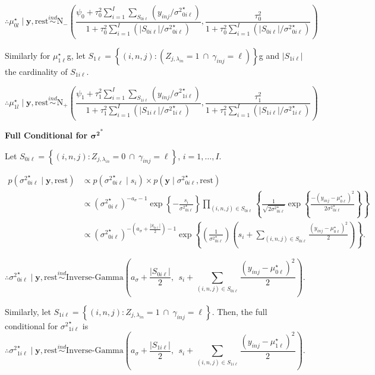 \documentclass[12pt,]{article}
\newcommand{\p}[1]{\left(#1\right)}
\newcommand{\bc}[1]{ \left\{#1\right\} }
\newcommand{\abs}[1]{ \left|#1\right| }
\newcommand{\N}{ \mathcal{N} }
\newcommand{\ind}{\overset{ind}{\sim}}
\def\N{\text{N}}
\def\IG{\text{Inverse-Gamma}}
\def\lin{\lambda_{in}}
\def\y{\bm{y}}
\def\mus{\mu^\star}
\def\sss{{\sigma^2}^\star}
\def\rest{\text{rest}}
\begin{document}
\[
\renewcommand\musZeroPostvarDenom{
  1 + \tau^2_0\sum_{i=1}^I(|S_{0i\ell}|/{\sigma^2}^\star_{0i\ell})
}
\renewcommand\musZeroPostMeanNum{
  \psi_0 + \tau^2_0 \sum_{i=1}^I\sum_{S_{0i\ell}} (y_{inj} / {\sigma^2}^\star_{0i\ell})
}
\therefore \mus_{0l} \mid \y, \rest \ind \N_-\p{
  \frac{\musZeroPostMeanNum}{\musZeroPostvarDenom},
  \frac{\tau^2_0}{\musZeroPostvarDenom}
}
\]

Similarly for \(\mus_{1\ell}\)g, let
\(S_{1\ell} = \bc{(i,n,j) : \p{Z_{j,\lin} = 1 ~\cap~ \gamma_{inj} = \ell}}\)g
and \(|S_{1i\ell}|\) the cardinality of \(S_{1i\ell}\).

\[
\newcommand\musOnePostvarDenom{
  1 + \tau^2_1 \sum_{i=1}^I (|S_{1i\ell}|/{\sigma^2}^\star_{1i\ell})
}
\newcommand\musOnePostMeanNum{
  \psi_1 + \tau^2_1 \sum_{i=1}^I \sum_{S_{1i\ell}} (y_{inj} / {\sigma^2}^\star_{1i\ell})
}
\therefore \mus_{1l} \mid \y, \rest \ind \N_+\p{
  \frac{\musOnePostMeanNum}{\musOnePostvarDenom},
  \frac{\tau^2_1}{\musOnePostvarDenom}
}
\]
\vspace{2em}


\textbf{Full Conditional for $\bm{{\sigma^2}}^*$}

Let
\(S_{0i\ell} = \bc{(i, n,j): Z_{j,\lin} = 0 ~\cap~ \gamma_{inj}=\ell}\),
\(i=1, \ldots, I\).

\begin{align*}
p(\sss_{0i\ell} \mid \y, \rest) &\propto p(\sss_{0i\ell} \mid s_i) \times p(\y \mid \sss_{0i\ell}, \rest) \\
&\propto (\sss_{0i\ell})^{-a_\sigma-1} \exp\bc{-\frac{s_i}{\sss_{0i\ell}}} 
\prod_{(i,n,j)\in S_{0i\ell}} \bc{
  \frac{1}{\sqrt{2\sss_{0i\ell}}}
  \exp\bc{\frac{-(y_{inj}-\mus_{0\ell})^2}{2\sss_{0i\ell}}}
} \\
&\propto (\sss_{0i\ell})^{-(a_\sigma + \frac{\abs{S_{0i\ell}}}{2})-1}
\exp\bc{\p{\frac{1}{\sss_{0i\ell}}}\p{s_i + \sum_{(i,n,j)\in S_{0i\ell}}
\frac{(y_{inj}-\mus_{0\ell})^2}{2}
}}.
\end{align*}

\[
\therefore \sss_{0i\ell} \mid \y, \rest \ind
\IG\p{a_\sigma + \frac{\abs{S_{0i\ell}}}{2}, ~~ s_i + \sum_{(i,n,j)\in S_{0i\ell}}
\frac{(y_{inj}-\mus_{0\ell})^2}{2}
}.
\]

Similarly, let
\(S_{1i\ell} = \bc{(i, n,j): Z_{j,\lin} = 1 ~\cap~ \gamma_{inj}=\ell}\).
Then, the full conditional for \(\sss_{1i\ell}\) is \[
\therefore \sss_{1i\ell} \mid \y, \rest \ind
\IG\p{a_\sigma + \frac{\abs{S_{1i\ell}}}{2}, ~~ s_i + \sum_{(i,n,j)\in S_{1i\ell}}
\frac{(y_{inj}-\mus_{1\ell})^2}{2}
}.
\]
\vspace{2em}
\end{document}
